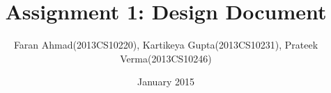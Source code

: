 \documentclass{article}
\begin{document}
\title{Assignment 1: Design Document}
\author{ Faran Ahmad(2013CS10220), Kartikeya Gupta(2013CS10231), Prateek Verma(2013CS10246)}
\date{January 2015}

\maketitle



\end{document}
